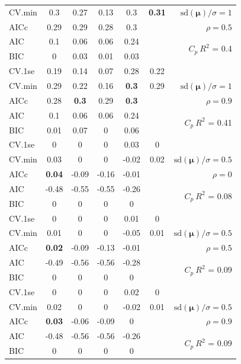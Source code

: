 \documentclass[12pt]{article}
\newcommand{\mr}[1]{\mathrm{#1}}
\newcommand{\bm}[1]{\mathbf{#1}}
\begin{document}
\begin{table}[p]
\begin{center}
\begin{tabular}{l*{5}{c}|r}
CV.min & 0.3 & 0.27 & 0.13 & 0.3 & {\bf 0.31} &  $\mr{sd}(\bm{\mu})/\sigma=1$ \\
AICc & 0.29 & 0.29 & 0.28 & 0.3 & & $\rho=0.5$ \\
AIC & 0.1 & 0.06 & 0.06 & 0.24 & & \multirow{2}{*}{$C_p ~ R^2$ = 0.4} \\
BIC & 0 & 0.03 & 0.01 & 0.03 & & \\
 \hline 
CV.1se & 0.19 & 0.14 & 0.07 & 0.28 & 0.22 &\\
CV.min & 0.29 & 0.22 & 0.16 & {\bf 0.3} & 0.29 &  $\mr{sd}(\bm{\mu})/\sigma=1$ \\
AICc & 0.28 & {\bf 0.3} & 0.29 & {\bf 0.3} & & $\rho=0.9$ \\
AIC & 0.1 & 0.06 & 0.06 & 0.24 & & \multirow{2}{*}{$C_p ~ R^2$ = 0.41} \\
BIC & 0.01 & 0.07 & 0 & 0.06 & & \\
 \hline 
CV.1se & 0 & 0 & 0 & 0.03 & 0 &\\
CV.min & 0.03 & 0 & 0 & -0.02 & 0.02 &  $\mr{sd}(\bm{\mu})/\sigma=0.5$ \\
AICc & {\bf 0.04} & -0.09 & -0.16 & -0.01 & & $\rho=0$ \\
AIC & -0.48 & -0.55 & -0.55 & -0.26 & & \multirow{2}{*}{$C_p ~ R^2$ = 0.08} \\
BIC & 0 & 0 & 0 & 0 & & \\
 \hline 
CV.1se & 0 & 0 & 0 & 0.01 & 0 &\\
CV.min & 0.01 & 0 & 0 & -0.05 & 0.01 &  $\mr{sd}(\bm{\mu})/\sigma=0.5$ \\
AICc & {\bf 0.02} & -0.09 & -0.13 & -0.01 & & $\rho=0.5$ \\
AIC & -0.49 & -0.56 & -0.56 & -0.28 & & \multirow{2}{*}{$C_p ~ R^2$ = 0.09} \\
BIC & 0 & 0 & 0 & 0 & & \\
 \hline 
CV.1se & 0 & 0 & 0 & 0.02 & 0 &\\
CV.min & 0.02 & 0 & 0 & -0.02 & 0.01 &  $\mr{sd}(\bm{\mu})/\sigma=0.5$ \\
AICc & {\bf 0.03} & -0.06 & -0.09 & 0 & & $\rho=0.9$ \\
AIC & -0.48 & -0.56 & -0.56 & -0.26 & & \multirow{2}{*}{$C_p ~ R^2$ = 0.09} \\
BIC & 0 & 0 & 0 & 0 & & \\
 \hline 
\end{tabular}
\end{center}
\vspace{-1cm}
\end{table}
\end{document}
